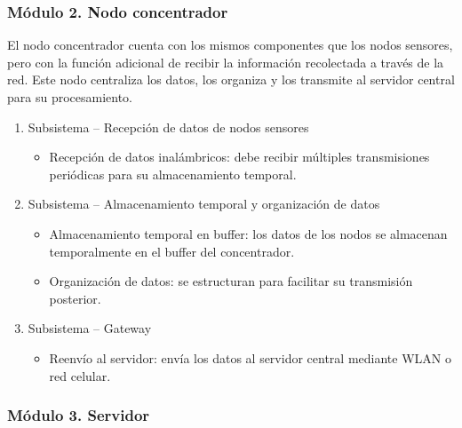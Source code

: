 \subsubsection*{Módulo 2. Nodo concentrador}

El nodo concentrador cuenta con los mismos componentes que los nodos sensores, pero con la función adicional de recibir la información recolectada a través de la red. Este nodo centraliza los datos, los organiza y los transmite al servidor central para su procesamiento.

\begin{enumerate}
    \item Subsistema – Recepción de datos de nodos sensores
    \begin{itemize}
        \item Recepción de datos inalámbricos: debe recibir múltiples transmisiones periódicas para su almacenamiento temporal.
    \end{itemize}

    \item Subsistema – Almacenamiento temporal y organización de datos
    \begin{itemize}
        \item Almacenamiento temporal en buffer: los datos de los nodos se almacenan temporalmente en el buffer del concentrador.
        \item Organización de datos: se estructuran para facilitar su transmisión posterior.
    \end{itemize}

    \item Subsistema – Gateway
    \begin{itemize}
        \item Reenvío al servidor: envía los datos al servidor central mediante WLAN o red celular.
    \end{itemize}
\end{enumerate}

\subsubsection*{Módulo 3. Servidor}

